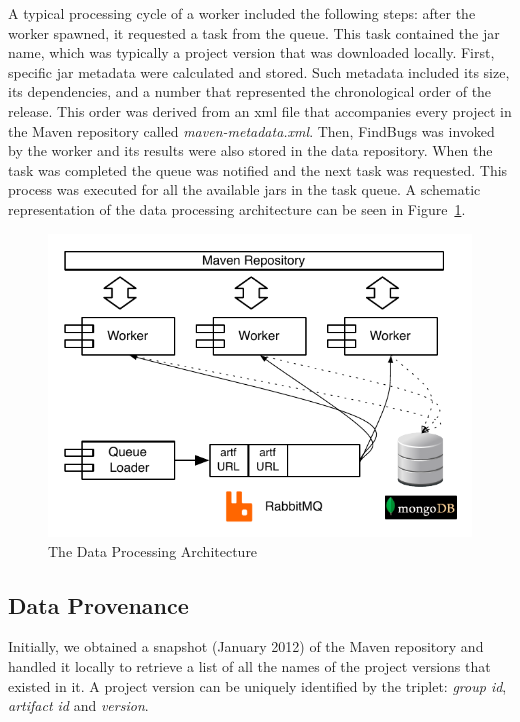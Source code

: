 \documentclass{sig-alternate}
\begin{document}
A typical processing cycle of a worker included the following steps: after
the worker spawned, it requested a task from the queue. This task contained
the {\sc jar} name, which was typically a project version that was downloaded locally.
First, specific {\sc jar} metadata were calculated and stored. Such metadata included
its size, its dependencies, and a number that represented the chronological order of the
release. This order was derived from an {\sc xml} file that
accompanies every project in the Maven repository called {\it
maven-metadata.xml}. Then, FindBugs was invoked by the worker and its results were
also stored in the data repository. When the task was completed the queue
was notified and the next task was requested. This process was executed for
all the available {\sc jar}s in the task queue. A schematic representation of
the data processing architecture can be seen in Figure~\ref{fig:arch}.

\begin{figure}[t]
  \begin{center}
    \includegraphics[scale=0.75]{figures/arch.pdf}
  \end{center}
  \caption{The Data Processing Architecture}
  \label{fig:arch}
\end{figure}

\subsection{Data Provenance}
\label{sec:data}

Initially, we obtained a snapshot (January 2012) of the Maven repository and
handled it locally to retrieve a list of all the names of the project versions
that existed in it. A project version can be uniquely identified by the triplet:
{\it group id}, {\it artifact id} and {\it version}.
\end{document}
